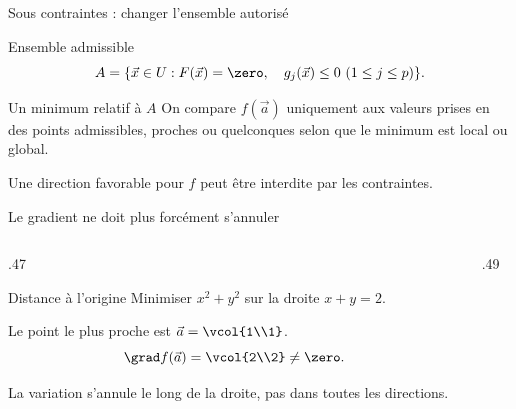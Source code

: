 \begin{frame}[t]{Sous contraintes : changer l’ensemble autorisé}
\coursanalyse
\begin{notion}{Ensemble admissible}
\[A=\{\vec x\in U:F(\vec x)=\zero,\quad g_j(\vec x)\le0\ (1\le j\le p)\}.\]
\end{notion}
\begin{cours}{Un minimum relatif à $A$}
On compare $f(\vec a)$ uniquement aux valeurs prises en des points admissibles, proches ou quelconques selon que le minimum est local ou global.
\end{cours}\vfill Une direction favorable pour $f$ peut être interdite par les contraintes.
\end{frame}

\begin{frame}[t]{Le gradient ne doit plus forcément s’annuler}
\coursanalyse
\begin{columns}[T,onlytextwidth]\begin{column}{.47\textwidth}
\begin{exemple}{Distance à l’origine}
Minimiser $x^2+y^2$ sur la droite $x+y=2$.
\par Le point le plus proche est $\vec a=\vcol{1\\1}$.
\[\grad f(\vec a)=\vcol{2\\2}\ne\zero.\]
\end{exemple}
La variation s’annule le long de la droite, pas dans toutes les directions.
\end{column}\begin{column}{.49\textwidth}\end{column}\end{columns}
\end{frame}

